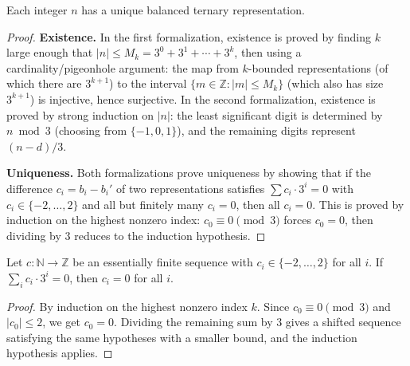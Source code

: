 \begin{theorem}
\label{thm.fps.laure.balanced-tern-rep-uniq}
\leantarget
\leanok
Each integer $n$ has a unique balanced ternary representation.
\end{theorem}

\begin{proof}
\leanok
\textbf{Existence.}
In the first formalization, existence is proved
by finding $k$ large enough that $|n| \le M_k = 3^0 + 3^1 + \cdots + 3^k$,
then using a cardinality/pigeonhole argument: the map from $k$-bounded
representations (of which there are $3^{k+1}$) to the interval
$\{m \in \mathbb{Z} : |m| \le M_k\}$ (which also has size $3^{k+1}$) is
injective, hence surjective.
In the second formalization, existence is proved
by strong induction on $|n|$: the least significant digit is determined
by $n \bmod 3$ (choosing from $\{-1,0,1\}$), and the remaining digits
represent $(n - d) / 3$.

\textbf{Uniqueness.}
Both formalizations prove uniqueness by showing that if the difference
$c_i = b_i - b_i'$ of two representations satisfies
$\sum c_i \cdot 3^i = 0$ with $c_i \in \{-2,\ldots,2\}$ and all but
finitely many $c_i = 0$, then all $c_i = 0$. This is proved by
induction on the highest nonzero index: $c_0 \equiv 0 \pmod{3}$ forces
$c_0 = 0$, then dividing by $3$ reduces to the induction hypothesis.
\end{proof}

\begin{lemma}
\label{lem.fps.laure.sum-powers-three-zero}
\leanhelper
\leanok
Let $c : \mathbb{N} \to \mathbb{Z}$ be an essentially finite sequence
with $c_i \in \{-2, \ldots, 2\}$ for all $i$.
If $\sum_{i} c_i \cdot 3^i = 0$, then $c_i = 0$ for all $i$.
\end{lemma}

\begin{proof}
\leanok
By induction on the highest nonzero index $k$.
Since $c_0 \equiv 0 \pmod{3}$ and $|c_0| \le 2$, we get $c_0 = 0$.
Dividing the remaining sum by $3$ gives a shifted sequence satisfying the
same hypotheses with a smaller bound, and the induction hypothesis applies.
\end{proof}

